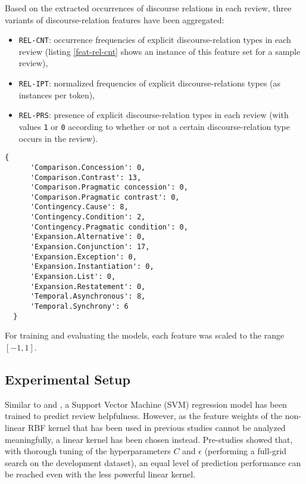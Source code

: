\documentclass[
    a4paper,%
    12pt,%
    oneside,%
    toc=bibliography,
    final,
]{scrartcl}
\begin{document}
Based on the extracted occurrences of discourse relations in each review, three variants of discourse-relation features have been aggregated:

\begin{itemize}
\item \lstinline|REL-CNT|: occurrence frequencies of explicit discourse-relation types in each review (listing \ref{feat-rel-cnt} shows an instance of this feature set for a sample review),
\item \lstinline|REL-IPT|: normalized frequencies of explicit discourse-relations types (as instances per token),
\item \lstinline|REL-PRS|: presence of explicit discourse-relation types in each review (with values \lstinline|1| or \lstinline|0| according to whether or not a certain discourse-relation type occurs in the review).
\end{itemize}

\begin{lstlisting}[caption=\texttt{REL-CNT} feature for a sample review., label=feat-rel-cnt, basicstyle=\ttfamily\small\singlespacing, float]
  {
      'Comparison.Concession': 0,
      'Comparison.Contrast': 13,
      'Comparison.Pragmatic concession': 0,
      'Comparison.Pragmatic contrast': 0,
      'Contingency.Cause': 8,
      'Contingency.Condition': 2,
      'Contingency.Pragmatic condition': 0,
      'Expansion.Alternative': 0,
      'Expansion.Conjunction': 17,
      'Expansion.Exception': 0,
      'Expansion.Instantiation': 0,
      'Expansion.List': 0,
      'Expansion.Restatement': 0,
      'Temporal.Asynchronous': 8,
      'Temporal.Synchrony': 6
  }
\end{lstlisting}

For training and evaluating the models, each feature was scaled to the range $ [-1, 1] $.


\subsection{Experimental Setup}

Similar to \citet{Kim2006} and \citet{Golly2017}, a Support Vector Machine (SVM) regression model has been trained to predict review helpfulness. However, as the feature weights of the non-linear RBF kernel that has been used in previous studies cannot be analyzed meaningfully, a linear kernel has been chosen instead. Pre-studies showed that, with thorough tuning of the hyperparameters $ C $ and $ \epsilon $ (performing a full-grid search on the development dataset), an equal level of prediction performance can be reached even with the less powerful linear kernel.
\end{document}
